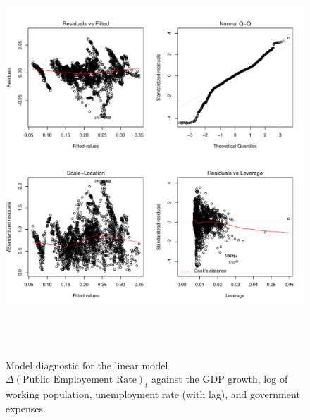 \message{ !name(main_simple_model_quarterly.tex)}\documentclass[a4paper, 10pt]{article}
\begin{document}
\begin{figure}
    \centering
    \includegraphics[height=15cm]{model_diagnostic_quarterly}
    \caption{Model diagnostic for the linear model $\Delta( \textrm{Public
        Employement Rate})_t$ against the GDP growth, log of working
      population, unemployment rate (with lag), and government expenses.}
   \end{figure}
\end{document}
